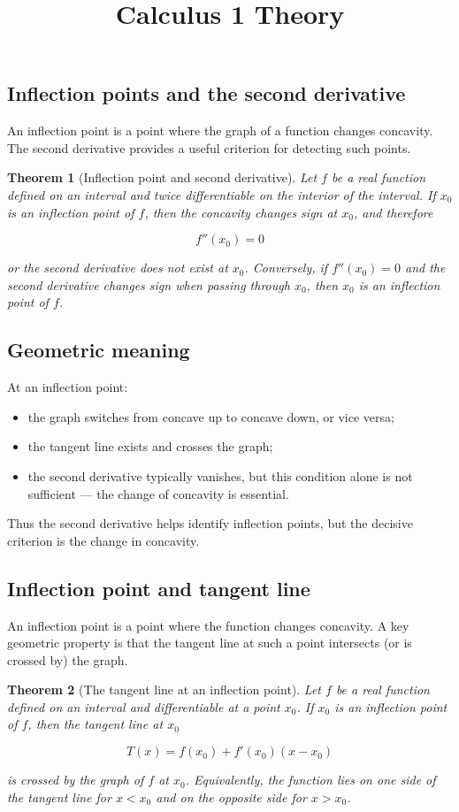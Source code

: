 \documentclass[11pt,a4paper]{article} \usepackage[T1]{fontenc}
\theoremstyle{plain} \newtheorem{theorem}{Theorem} \title{Calculus 1 Theory}
\begin{document}
\subsection {Inflection points and the second derivative}

An inflection point is a point where the graph of a function changes concavity.
The second derivative provides a useful criterion for detecting such points.

\begin{theorem}
[Inflection point and second derivative] Let $f$ be a real function defined on
an interval and twice differentiable on the interior of the interval. If $x_0$
is an inflection point of $f$, then the concavity changes sign at $x_0$, and
therefore

\[
f''(x_0) = 0
\]

or the second derivative does not exist at $x_0$. Conversely, if $f''(x_0)=0$
and the second derivative changes sign when passing through $x_0$, then $x_0$
is an inflection point of $f$.
\end{theorem}

\subsection*{Geometric meaning}

At an inflection point:

\begin{itemize}
\item the graph switches from concave up to concave down, or vice versa;
\item the tangent line exists and crosses the graph;
\item the second derivative typically vanishes, but this condition alone is not
sufficient — the change of concavity is essential.
\end{itemize}

Thus the second derivative helps identify inflection points, but the decisive
criterion is the change in concavity.

\subsection {Inflection point and tangent line}

An inflection point is a point where the function changes concavity. A key
geometric property is that the tangent line at such a point intersects (or is
crossed by) the graph.

\begin{theorem}
[The tangent line at an inflection point] Let $f$ be a real function defined on
an interval and differentiable at a point $x_0$. If $x_0$ is an inflection
point of $f$, then the tangent line at $x_0$

\[
T(x) = f(x_0) + f'(x_0)(x - x_0)
\]

is crossed by the graph of $f$ at $x_0$. Equivalently, the function lies on one
side of the tangent line for $x < x_0$ and on the opposite side for $x > x_0$.
\end{theorem}
\end{document}

